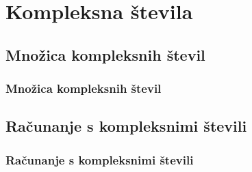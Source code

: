 \section{Kompleksna števila}

\begin{frame}
    \sectionpage
\end{frame}

\begin{frame}
\end{frame}


    \subsection{Množica kompleksnih števil}

        \begin{frame}
            \frametitle{Množica kompleksnih števil}
        \end{frame}

    \subsection{Računanje s kompleksnimi števili}

        \begin{frame}
            \frametitle{Računanje s kompleksnimi števili}
        \end{frame}
